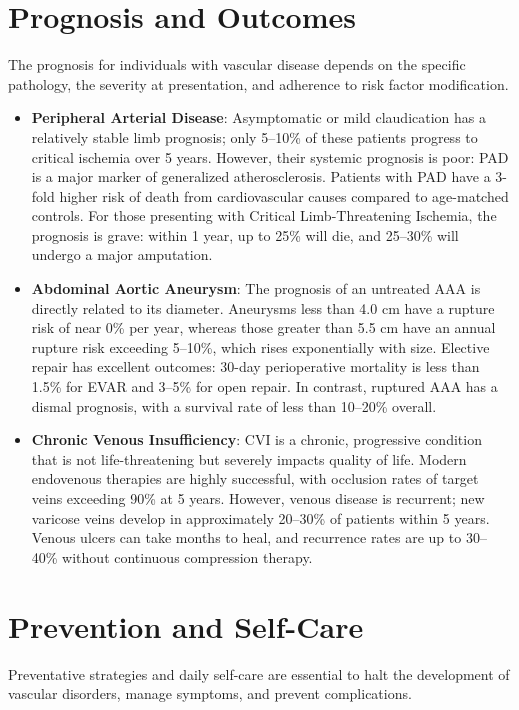 \section*{Prognosis and Outcomes}
The prognosis for individuals with vascular disease depends on the specific pathology, the severity at presentation, and adherence to risk factor modification.

\begin{itemize}
    \item \textbf{Peripheral Arterial Disease}: Asymptomatic or mild claudication has a relatively stable limb prognosis; only 5--10\% of these patients progress to critical ischemia over 5 years. However, their systemic prognosis is poor: PAD is a major marker of generalized atherosclerosis. Patients with PAD have a 3-fold higher risk of death from cardiovascular causes compared to age-matched controls. For those presenting with Critical Limb-Threatening Ischemia, the prognosis is grave: within 1 year, up to 25\% will die, and 25--30\% will undergo a major amputation.
    \item \textbf{Abdominal Aortic Aneurysm}: The prognosis of an untreated AAA is directly related to its diameter. Aneurysms less than 4.0 cm have a rupture risk of near 0\% per year, whereas those greater than 5.5 cm have an annual rupture risk exceeding 5--10\%, which rises exponentially with size. Elective repair has excellent outcomes: 30-day perioperative mortality is less than 1.5\% for EVAR and 3--5\% for open repair. In contrast, ruptured AAA has a dismal prognosis, with a survival rate of less than 10--20\% overall.
    \item \textbf{Chronic Venous Insufficiency}: CVI is a chronic, progressive condition that is not life-threatening but severely impacts quality of life. Modern endovenous therapies are highly successful, with occlusion rates of target veins exceeding 90\% at 5 years. However, venous disease is recurrent; new varicose veins develop in approximately 20--30\% of patients within 5 years. Venous ulcers can take months to heal, and recurrence rates are up to 30--40\% without continuous compression therapy.
\end{itemize}

\section*{Prevention and Self-Care}
Preventative strategies and daily self-care are essential to halt the development of vascular disorders, manage symptoms, and prevent complications.

